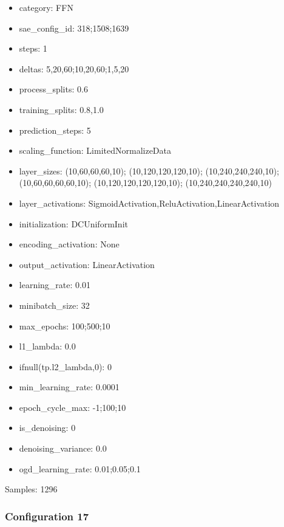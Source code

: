 \documentclass[a4paper,11pt,oneside]{article}
\theoremstyle{plain}
\theoremstyle{definition}
\begin{document}
\begin{itemize}
	\item category: FFN
	\item sae\_config\_id: 318;1508;1639
	\item steps: 1
	\item deltas: 5,20,60;10,20,60;1,5,20
	\item process\_splits: 0.6
	\item training\_splits: 0.8,1.0
	\item prediction\_steps: 5
	\item scaling\_function: LimitedNormalizeData
	\item layer\_sizes: (10,60,60,60,10); (10,120,120,120,10); (10,240,240,240,10); (10,60,60,60,60,10); (10,120,120,120,120,10); (10,240,240,240,240,10)
	\item layer\_activations: SigmoidActivation,ReluActivation,LinearActivation
	\item initialization: DCUniformInit
	\item encoding\_activation: None
	\item output\_activation: LinearActivation
	\item learning\_rate: 0.01
	\item minibatch\_size: 32
	\item max\_epochs: 100;500;10
	\item l1\_lambda: 0.0
	\item ifnull(tp.l2\_lambda,0): 0
	\item min\_learning\_rate: 0.0001
	\item epoch\_cycle\_max: -1;100;10
	\item is\_denoising: 0
	\item denoising\_variance: 0.0
	\item ogd\_learning\_rate: 0.01;0.05;0.1
\end{itemize}

Samples: 1296

\subsubsection{Configuration 17}\label{config17}
\end{document}
